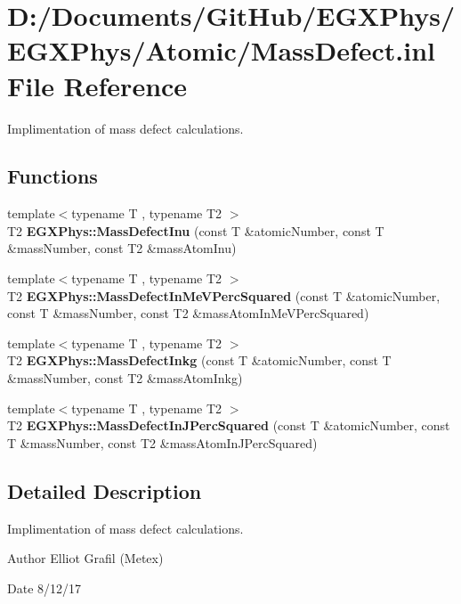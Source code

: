 \hypertarget{_mass_defect_8inl}{}\section{D\+:/\+Documents/\+Git\+Hub/\+E\+G\+X\+Phys/\+E\+G\+X\+Phys/\+Atomic/\+Mass\+Defect.inl File Reference}
\label{_mass_defect_8inl}


Implimentation of mass defect calculations.  


\subsection*{Functions}
\begin{DoxyCompactItemize}
\item 
{\footnotesize template$<$typename T , typename T2 $>$ }\\T2 {\bfseries E\+G\+X\+Phys\+::\+Mass\+Defect\+Inu} (const T \&atomic\+Number, const T \&mass\+Number, const T2 \&mass\+Atom\+Inu)
\item 
{\footnotesize template$<$typename T , typename T2 $>$ }\\T2 {\bfseries E\+G\+X\+Phys\+::\+Mass\+Defect\+In\+Me\+V\+Perc\+Squared} (const T \&atomic\+Number, const T \&mass\+Number, const T2 \&mass\+Atom\+In\+Me\+V\+Perc\+Squared)
\item 
{\footnotesize template$<$typename T , typename T2 $>$ }\\T2 {\bfseries E\+G\+X\+Phys\+::\+Mass\+Defect\+Inkg} (const T \&atomic\+Number, const T \&mass\+Number, const T2 \&mass\+Atom\+Inkg)
\item 
{\footnotesize template$<$typename T , typename T2 $>$ }\\T2 {\bfseries E\+G\+X\+Phys\+::\+Mass\+Defect\+In\+J\+Perc\+Squared} (const T \&atomic\+Number, const T \&mass\+Number, const T2 \&mass\+Atom\+In\+J\+Perc\+Squared)
\end{DoxyCompactItemize}


\subsection{Detailed Description}
Implimentation of mass defect calculations. 

\begin{DoxyAuthor}{Author}
Elliot Grafil (Metex) 
\end{DoxyAuthor}
\begin{DoxyDate}{Date}
8/12/17 
\end{DoxyDate}
